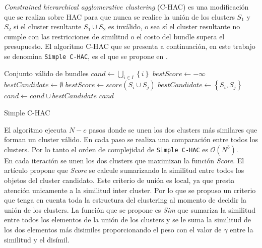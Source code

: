 \textit{Constrained hierarchical agglomerative clustering} (C-HAC) es una modificación que se realiza sobre HAC para que nunca se realice la unión de los clusters $S_1$ y $S_2$ si el cluster resultante $S_1 \cup S_2$ es inválido, o sea sí el cluster resultante no cumple con las restricciones de similitud o el costo del bundle supera el presupuesto. El algoritmo C-HAC que se presenta a continuación, en este trabajo se denomina \texttt{Simple C-HAC}, es el que se propone en \cite{compositeRetrival}.\\

\begin{algorithm}[H]
\begin{algorithmic}[1]
\ENSURE Conjunto válido de bundles
\STATE $cand \leftarrow \bigcup_{i \in I}\left\{i\right\}$
	\STATE $bestScore \leftarrow -\infty$
	\STATE $bestCandidate \leftarrow \emptyset$
			 \label{validMerge}
				 \label{score}
					\STATE $bestScore \leftarrow score(S_i \cup  S_j)$
					\STATE $bestCandidate \leftarrow \left\{S_i,S_j\right\}$
				\ENDIF
			\ENDIF
		\ENDFOR
	\ENDFOR
		\BREAK
	\ENDIF
	\STATE $cand \leftarrow cand \cup bestCandidate $
\ENDWHILE
\RETURN $cand$
\end{algorithmic}
\caption{Simple C-HAC}\label{alg:SimpleC-HAC}
\end{algorithm}

El algoritmo ejecuta $N - c$ pasos donde se unen los dos clusters más similares que forman un cluster válido. En cada paso se realiza una comparación entre todos los clusters. Por lo tanto el orden de complejidad de \texttt{Simple C-HAC} es $\mathcal{O}(N^{3})$.\\

En cada iteración se unen los dos clusters que maximizan la función \textit{Score}. El artículo \cite{compositeRetrival} propone que \textit{Score} se calcule sumarizando la similitud entre todos los objetos del cluster candidato. Este criterio de unión es local, ya que presta atención unicamente a la similitud inter cluster. Por lo que se propuso un criterio que tenga en cuenta toda la estructura del clustering al momento de decidir la unión de los clusters. La función que se propone es \textit{Sim} que sumariza la similitud entre todos los elementos de la unión de los clusters y se le suma la similitud de los dos elementos más disimiles proporcionando el peso con el valor de $\gamma$ entre la similitud y el disímil.\\

